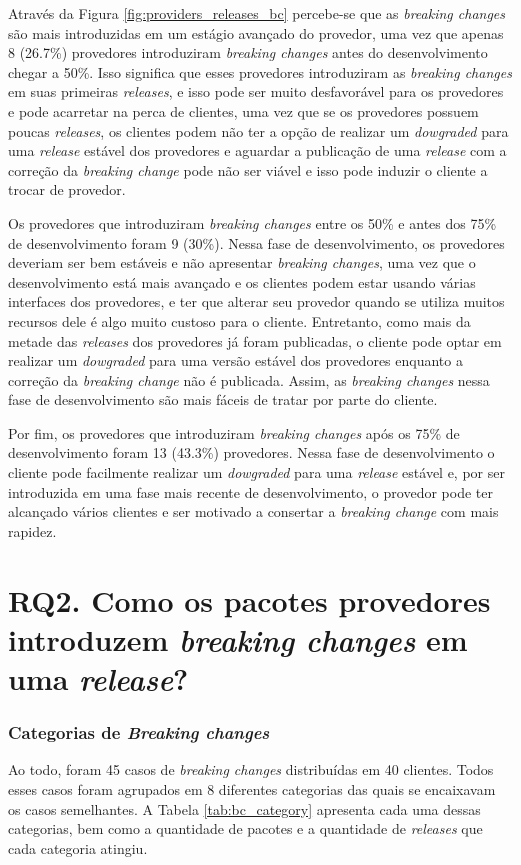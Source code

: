 Através da Figura \ref{fig:providers_releases_bc} percebe-se que as \textit{breaking changes} são mais introduzidas em um estágio avançado do provedor, uma vez que apenas 8 (26.7\%) provedores introduziram \textit{breaking changes} antes do desenvolvimento chegar a 50\%.  Isso significa que esses provedores introduziram as \textit{breaking changes} em suas primeiras \textit{releases}, e isso pode ser muito desfavorável para os provedores e pode acarretar na perca de clientes, uma vez que se os provedores possuem poucas \textit{releases}, os clientes podem não ter a opção de realizar um \textit{dowgraded} para uma \textit{release} estável dos provedores e aguardar a publicação de uma \textit{release} com a correção da \textit{breaking change} pode não ser viável e isso pode induzir o cliente a trocar de provedor.

Os provedores que introduziram \textit{breaking changes} entre os 50\% e antes dos 75\% de desenvolvimento foram 9 (30\%). Nessa fase de desenvolvimento, os provedores deveriam ser bem estáveis e não apresentar \textit{breaking changes}, uma vez que o desenvolvimento está mais avançado e os clientes podem estar usando várias interfaces dos provedores, e ter que alterar seu provedor quando se utiliza muitos recursos dele é algo muito custoso para o cliente. Entretanto, como mais da metade das \textit{releases} dos provedores já foram publicadas, o cliente pode optar em realizar um \textit{dowgraded} para uma versão estável dos provedores enquanto a correção da \textit{breaking change} não é publicada. Assim, as \textit{breaking changes} nessa fase de desenvolvimento são mais fáceis de tratar por parte do cliente.

Por fim, os provedores que introduziram \textit{breaking changes} após os 75\% de desenvolvimento foram 13 (43.3\%) provedores. Nessa fase de desenvolvimento o cliente pode facilmente realizar um \textit{dowgraded} para uma \textit{release} estável e, por ser introduzida em uma fase mais recente de desenvolvimento, o provedor pode ter alcançado vários clientes e ser motivado a consertar a \textit{breaking change} com mais rapidez.
\section{RQ2. Como os pacotes provedores introduzem \textit{breaking changes} em uma \textit{release}?}
\label{sec:qp2:results}

\subsubsection{Categorias de \textit{Breaking changes}}
Ao todo, foram 45 casos de \textit{breaking changes} distribuídas em 40 clientes. Todos esses casos foram agrupados em 8 diferentes categorias das quais se encaixavam os casos semelhantes. A Tabela \ref{tab:bc_category} apresenta cada uma dessas categorias, bem como a quantidade de pacotes e a quantidade de \textit{releases} que cada categoria atingiu.

